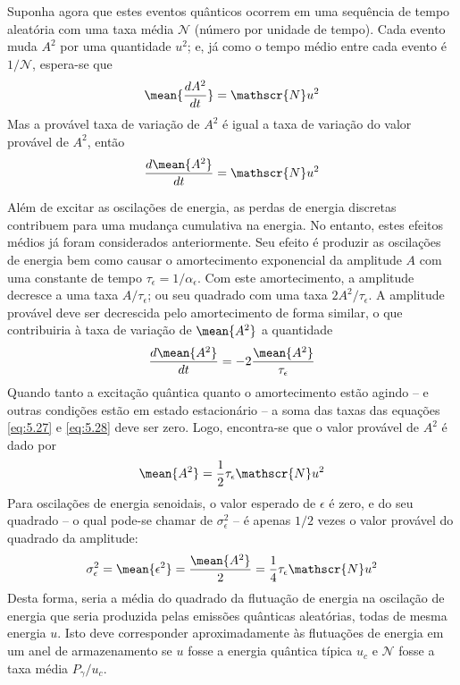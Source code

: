 Suponha agora que estes eventos quânticos ocorrem em uma sequência de tempo aleatória com uma taxa média $\mathscr{N}$ (número por unidade de tempo). Cada evento muda $A^2$ por uma quantidade $u^2$; e, já como o tempo médio entre cada evento é $1/\mathscr{N}$, espera-se que
\begin{align}
	\mean{\frac{dA^2}{dt}} = \mathscr{N}u^2
\end{align}
Mas a provável taxa de variação de $A^2$ é igual a taxa de variação do valor provável de $A^2$, então
\begin{align}
	\frac{d\mean{A^2}}{dt} = \mathscr{N}u^2\label{eq:5.27}
\end{align}

Além de excitar as oscilações de energia, as perdas de energia discretas contribuem para uma mudança cumulativa na energia. No entanto, estes efeitos médios já foram considerados anteriormente. Seu efeito é produzir as oscilações de energia bem como causar o amortecimento exponencial da amplitude $A$ com uma constante de tempo $\tau_\epsilon = 1/\alpha_\epsilon$. Com este amortecimento, a amplitude decresce a uma taxa $A/\tau_\epsilon$; ou seu quadrado com uma taxa $2A^2/\tau_\epsilon$. A amplitude provável deve ser decrescida pelo amortecimento de forma similar, o que contribuiria à taxa de variação de $\mean{A^2}$ a quantidade
\begin{align}
	\frac{d\mean{A^2}}{dt} = -2\frac{\mean{A^2}}{\tau_\epsilon}\label{eq:5.28}
\end{align}
Quando tanto a excitação quântica quanto o amortecimento estão agindo -- e outras condições estão em estado estacionário -- a soma das taxas das equações \eqref{eq:5.27} e \eqref{eq:5.28} deve ser zero. Logo, encontra-se que o valor provável de $A^2$ é dado por
\begin{align}
	\mean{A^2} = \frac{1}{2}\tau_\epsilon \mathscr{N}u^2
\end{align}
Para oscilações de energia senoidais, o valor esperado de $\epsilon$ é zero, e do seu quadrado -- o qual pode-se chamar de $\sigma_\epsilon^2$ -- é apenas $1/2$ vezes o valor provável do quadrado da amplitude:
\begin{align}
	\sigma_\epsilon^2 = \mean{\epsilon^2} = \frac{\mean{A^2}}{2} = \frac{1}{4}\tau_\epsilon \mathscr{N} u^2\label{eq:5.30}
\end{align}
Desta forma, seria a média do quadrado da flutuação de energia na oscilação de energia que seria produzida pelas emissões quânticas aleatórias, todas de mesma energia $u$. Isto deve corresponder aproximadamente às flutuações de energia em um anel de armazenamento se $u$ fosse a energia quântica típica $u_c$ e $\mathscr{N}$ fosse a taxa média $P_\gamma/u_c$.

